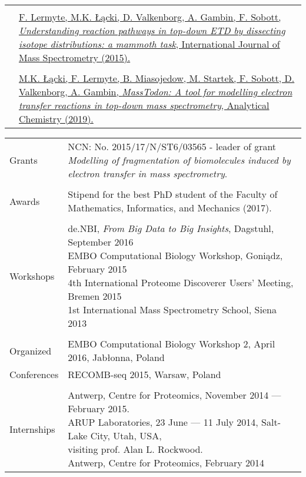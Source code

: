 \documentclass[letterpaper,11pt,oneside]{article}
\begin{document}
\begin{tabular}{@{} l l}
    & \\
    & \parbox{5.0in}{\href{http://www.sciencedirect.com/science/article/pii/S1387380615002572}{F. Lermyte, M.K. Łącki, D. Valkenborg, A. Gambin, F. Sobott, \textit{Understanding reaction pathways in top-down ETD by dissecting isotope distributions: a mammoth task}, International Journal of Mass Spectrometry (2015).}}\\
    & \\
    & \parbox{5.0in}{\href{https://arxiv.org/abs/1708.00234}{M.K. Łącki, F. Lermyte, B. Miasojedow, M. Startek, F. Sobott, D. Valkenborg, A. Gambin, \textit{MassTodon: A tool for modelling electron transfer reactions in top-down mass spectrometry}, Analytical Chemistry (2019).}}\\
\end{tabular}
\begin{tabular}{@{} l l}
\Large{Grants}
    & \parbox{5.0in}{NCN: No. 2015/17/N/ST6/03565 - leader of grant \textit{Modelling of fragmentation of biomolecules induced by electron transfer in mass spectrometry}.}\\
    &\\
\Large{Awards}
    & \parbox{5.0in}{Stipend for the best PhD student of the Faculty of Mathematics, Informatics, and Mechanics (2017).}\\
    &\\
\Large{Workshops}
    & \parbox{5.0in}{de.NBI, \textit{From Big Data to Big Insights}, Dagstuhl, September 2016\\
      EMBO Computational Biology Workshop, Goniądz, February 2015\\
      4th International Proteome Discoverer Users’ Meeting, Bremen 2015\\
      1st International Mass Spectrometry School, Siena 2013}\\
    &\\    
\Large{Organized} 
    & EMBO Computational Biology Workshop 2, April 2016, Jabłonna, Poland\\
\Large{Conferences}
    & RECOMB-seq 2015, Warsaw, Poland\\
    &\\
\Large{Internships}
    & \parbox{5.0in}{Antwerp, Centre for Proteomics, November 2014 — February 2015.\\
    ARUP Laboratories, 23 June — 11 July 2014, Salt-Lake City, Utah, USA,\\
    \quad visiting prof. Alan L. Rockwood.\\
    Antwerp, Centre for Proteomics, February 2014}\\

\end{tabular}
\end{document}
